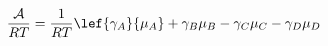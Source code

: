 \begin{equation}\label{eqn:reaction-affinity}
\frac{\mathcal{A}}{RT}=\frac{1}{RT}\lef{{\gamma }_{A}}{{\mu }_{A}}+{{\gamma }_{B}}{{\mu }_{B}}-{{\gamma }_{C}}{{\mu }_{C}}-{{\gamma }_{D}}{{\mu }_{D}}
\end{equation}